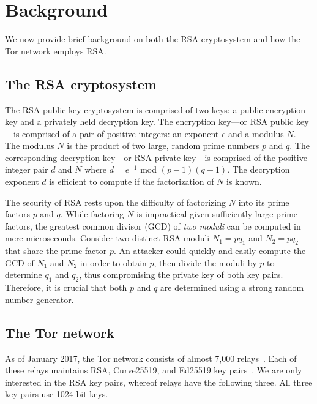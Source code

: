 \section{Background}
We now provide brief background on both the RSA cryptosystem and how the Tor
network employs RSA.

\subsection{The RSA cryptosystem}
The RSA public key cryptosystem is comprised of two keys: a public encryption
key and a privately held decryption key. The encryption key---or RSA public
key---is comprised of a pair of positive integers: an exponent $e$ and a modulus
$N$. The modulus $N$ is the product of two large, random prime numbers $p$ and
$q$. The corresponding decryption key---or RSA private key---is comprised of the
positive integer pair $d$ and $N$ where $d = e^{-1}$ mod $(p - 1)(q - 1)$.  The
decryption exponent $d$ is efficient to compute if the factorization of $N$ is
known.

The security of RSA rests upon the difficulty of factorizing $N$ into its prime
factors $p$ and $q$.  While factoring $N$ is impractical given sufficiently
large prime factors, the greatest common divisor (GCD) of \emph{two moduli} can
be computed in mere microseconds.  Consider two distinct RSA moduli $N_1 = pq_1$
and $N_2 = pq_2$ that share the prime factor $p$.  An attacker could quickly and
easily compute the GCD of $N_1$ and $N_2$ in order to obtain $p$, then divide
the moduli by $p$ to determine $q_1$ and $q_2$, thus compromising the private
key of both key pairs.  Therefore, it is crucial that both $p$ and $q$ are
determined using a strong random number generator.

\subsection{The Tor network}
As of January 2017, the Tor network consists of almost 7,000
relays~\cite{tormetrics}.  Each of these relays maintains RSA, Curve25519, and
Ed25519 key pairs~\cite[\S~1.1]{torspec}.  We are only interested in the
RSA key pairs, whereof relays have the following three.  All three key pairs use
1024-bit keys.

